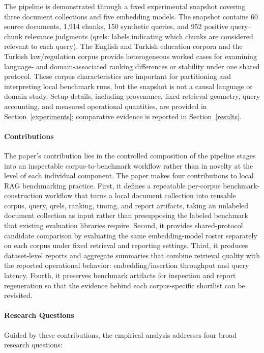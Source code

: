 The pipeline is demonstrated through a fixed experimental snapshot covering three document collections and five embedding models. The snapshot contains 60 source documents, 1{,}914 chunks, 150 synthetic queries, and 952 positive query--chunk relevance judgments (qrels: labels indicating which chunks are considered relevant to each query). The English and Turkish education corpora and the Turkish law/regulation corpus provide heterogeneous worked cases for examining language- and domain-associated ranking differences or stability under one shared protocol. These corpus characteristics are important for partitioning and interpreting local benchmark runs, but the snapshot is not a causal language or domain study. Setup details, including provenance, fixed retrieval geometry, query accounting, and measured operational quantities, are provided in Section~\ref{experiments}; comparative evidence is reported in Section~\ref{results}.

\paragraph{Contributions}\label{contributions}
The paper's contribution lies in the controlled composition of the pipeline stages into an inspectable corpus-to-benchmark workflow rather than in novelty at the level of each individual component. The paper makes four contributions to local RAG benchmarking practice. First, it defines a repeatable per-corpus benchmark-construction workflow that turns a local document collection into reusable corpus, query, qrels, ranking, timing, and report artifacts, taking an unlabeled document collection as input rather than presupposing the labeled benchmark that existing evaluation libraries require. Second, it provides shared-protocol candidate comparison by evaluating the same embedding-model roster separately on each corpus under fixed retrieval and reporting settings. Third, it produces dataset-level reports and aggregate summaries that combine retrieval quality with the reported operational behavior: embedding/insertion throughput and query latency. Fourth, it preserves benchmark artifacts for inspection and report regeneration so that the evidence behind each corpus-specific shortlist can be revisited.


\paragraph{Research Questions}\label{research-questions}
Guided by these contributions, the empirical analysis addresses four broad research questions:

